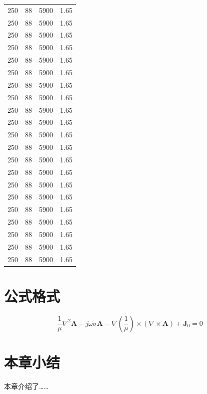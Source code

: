 \begin{ThreePartTable}
\begin{longtable}[c]{*{4}{c}}
    250	& 88 & 5900	& 1.65 \\
    250	& 88 & 5900	& 1.65 \\
    250	& 88 & 5900	& 1.65 \\
    250	& 88 & 5900	& 1.65 \\
    250	& 88 & 5900	& 1.65 \\
    250	& 88 & 5900	& 1.65 \\
    250	& 88 & 5900	& 1.65 \\
    250	& 88 & 5900	& 1.65 \\
    250	& 88 & 5900	& 1.65 \\
    250	& 88 & 5900	& 1.65 \\
    250	& 88 & 5900	& 1.65 \\
    250	& 88 & 5900	& 1.65 \\
    250	& 88 & 5900	& 1.65 \\
    250	& 88 & 5900	& 1.65 \\
    250	& 88 & 5900	& 1.65 \\
    250	& 88 & 5900	& 1.65 \\
    250	& 88 & 5900	& 1.65 \\
    250	& 88 & 5900	& 1.65 \\
    250	& 88 & 5900	& 1.65 \\
    250	& 88 & 5900	& 1.65 \\
    250	& 88 & 5900	& 1.65 \\
    \bottomrule
  \end{longtable}
\end{ThreePartTable}

\section{公式格式}
\begin{equation}
 \frac{1}{\mu} \nabla^{2} \mathbf{A}-j \omega \sigma \mathbf{A}-\nabla\left(\frac{1}{\mu}\right) \times(\nabla \times \mathbf{A})+\mathbf{J}_{0}=0
\end{equation}


\section{本章小结}
本章介绍了……
